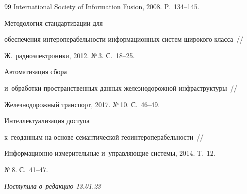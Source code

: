 {{\begin{thebibliography}{99}
International Society of Information Fusion, 2008. P.~134--145.







 Методология стандартизации для 


обеспечения интероперабельности информационных сис\-тем широкого класса~/\!\!/ 


Ж.~радиоэлектроники, 2012. №\,3. С.~18--25. 







 Автоматизация сбора 


и~обработки пространственных данных железнодорожной инфраструктуры~/\!\!/ 


Железнодорожный транспорт, 2017. №\,10. С.~46--49. 







 Интеллектуализация доступа 


к~геоданным на основе семантической геоинтероперабельности~/\!\!/  


Ин\-фор\-ма\-ци\-он\-но-из\-ме\-ри\-тель\-ные и~управ\-ля\-ющие сис\-те\-мы, 2014. Т.~12. 


№\,8. С.~41--47.





 \end{thebibliography}


} }











\vspace*{-6pt}





\hfill{\small\textit{Поступила в~редакцию 13.01.23}}





\vspace*{8pt}





